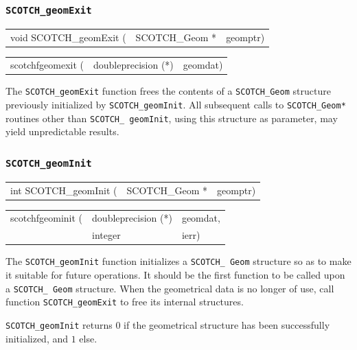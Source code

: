 \subsubsection{{\tt SCOTCH\_geomExit}}

\begin{itemize}
\progsyn

{\tt\begin{tabular}{l@{}ll}
void SCOTCH\_geomExit ( & SCOTCH\_Geom * & geomptr)
\end{tabular}}

{\tt\begin{tabular}{l@{}ll}
scotchfgeomexit ( & doubleprecision (*) & geomdat)
\end{tabular}}

\progdes

The {\tt SCOTCH\_geomExit} function frees the contents of a
{\tt SCOTCH\_\lbt Geom} structure previously initialized by
{\tt SCOTCH\_\lbt geomInit}. All subsequent calls to
{\tt SCOTCH\_\lbt *Geom*} routines other than {\tt SCOTCH\_\lbt
geomInit}, using this structure as parameter, may yield
unpredictable results.
\end{itemize}

\subsubsection{{\tt SCOTCH\_geomInit}}
\label{sec-lib-func-geominit}

\begin{itemize}
\progsyn

{\tt\begin{tabular}{l@{}ll}
int SCOTCH\_geomInit ( & SCOTCH\_Geom * & geomptr)
\end{tabular}}

{\tt\begin{tabular}{l@{}ll}
scotchfgeominit ( & doubleprecision (*) & geomdat, \\
                  & integer             & ierr)
\end{tabular}}

\progdes

The {\tt SCOTCH\_geomInit} function initializes a {\tt SCOTCH\_\lbt
Geom} structure so as to make it suitable for future operations. It
should be the first function to be called upon a {\tt SCOTCH\_\lbt
Geom} structure. When the geometrical data is no longer of use, call
function {\tt SCOTCH\_\lbt geom\lbt Exit} to free its internal
structures.

\progret

{\tt SCOTCH\_geomInit} returns $0$ if the geometrical structure has been
successfully initialized, and $1$ else.
\end{itemize}


